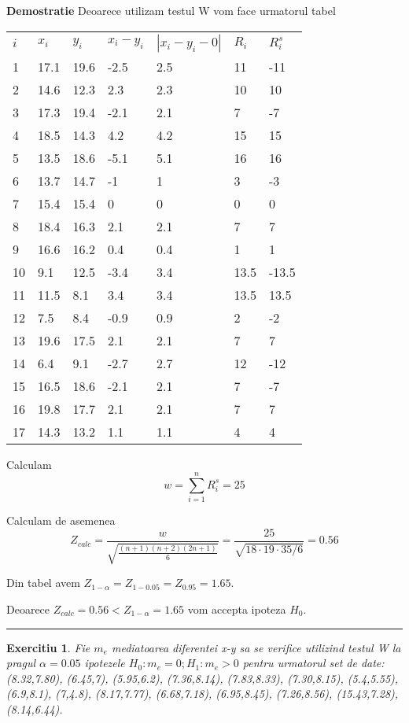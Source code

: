 \documentclass{article}
\newtheorem{exercise}[theorem]{Exercitiu}
\newenvironment{proof}[1][Proof]{\noindent\textbf{Demostratie} }{\ \rule{0.5em}{0.5em}}
\begin{document}
\begin{proof}
Deoarece utilizam testul W vom face urmatorul tabel

\begin{tabular}{lllllll}
$i$ & $x_{i}$ & $y_{i}$ & $x_{i}-y_{i}$ & $\left\vert
x_{i}-y_{i}-0\right\vert $ & $R_{i}$ & $R_{i}^{s}$ \\ 
1 & 17.1 & 19.6 & -2.5 & 2.5 & 11 & -11 \\ 
2 & 14.6 & 12.3 & 2.3 & 2.3 & 10 & 10 \\ 
3 & 17.3 & 19.4 & -2.1 & 2.1 & 7 & -7 \\ 
4 & 18.5 & 14.3 & 4.2 & 4.2 & 15 & 15 \\ 
5 & 13.5 & 18.6 & -5.1 & 5.1 & 16 & 16 \\ 
6 & 13.7 & 14.7 & -1 & 1 & 3 & -3 \\ 
7 & 15.4 & 15.4 & 0 & 0 & 0 & 0 \\ 
8 & 18.4 & 16.3 & 2.1 & 2.1 & 7 & 7 \\ 
9 & 16.6 & 16.2 & 0.4 & 0.4 & 1 & 1 \\ 
10 & 9.1 & 12.5 & -3.4 & 3.4 & 13.5 & -13.5 \\ 
11 & 11.5 & 8.1 & 3.4 & 3.4 & 13.5 & 13.5 \\ 
12 & 7.5 & 8.4 & -0.9 & 0.9 & 2 & -2 \\ 
13 & 19.6 & 17.5 & 2.1 & 2.1 & 7 & 7 \\ 
14 & 6.4 & 9.1 & -2.7 & 2.7 & 12 & -12 \\ 
15 & 16.5 & 18.6 & -2.1 & 2.1 & 7 & -7 \\ 
16 & 19.8 & 17.7 & 2.1 & 2.1 & 7 & 7 \\ 
17 & 14.3 & 13.2 & 1.1 & 1.1 & 4 & 4%
\end{tabular}

Calculam%
\[
w=\sum_{i=1}^{n}R_{i}^{s}=25
\]

Calculam de asemenea%
\[
Z_{calc}=\frac{w}{\sqrt{\frac{(n+1)(n+2)(2n+1)}{6}}}=\frac{25}{\sqrt{18\cdot
19\cdot 35/6}}=0.56
\]

Din tabel avem $Z_{1-\alpha }=Z_{1-0.05}=Z_{0.95}=1.65$.

Deoarece $Z_{calc}=0.56<Z_{1-\alpha }=1.65$ vom accepta ipoteza $H_{0}$.
\end{proof}

\begin{exercise}
Fie $m_{e}$ mediatoarea diferentei x-y sa se verifice utilizind testul W la
pragul $\alpha =0.05$ ipotezele $H_{0}:m_{e}=0;H_{1}:m_{e}>0$ pentru
urmatorul set de date: (8.32,7.80), (6.45,7), (5.95,6.2), (7.36,8.14),
(7.83,8.33), (7.30,8.15), (5.4,5.55), (6.9,8.1), (7,4.8), (8.17,7.77),
(6.68,7.18), (6.95,8.45), (7.26,8.56), (15.43,7.28), (8.14,6.44).
\end{exercise}
\end{document}
